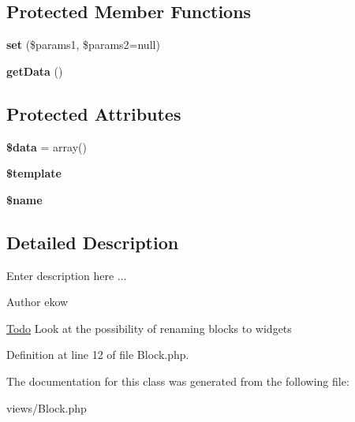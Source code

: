 \subsection*{Protected Member Functions}
\begin{DoxyCompactItemize}
\item 
\hypertarget{class_block_ae61665b42623aa60b64269393930163b}{
{\bfseries set} (\$params1, \$params2=null)}
\label{class_block_ae61665b42623aa60b64269393930163b}

\item 
\hypertarget{class_block_a6d15a2c34abf0344b58a46f60d5dee21}{
{\bfseries getData} ()}
\label{class_block_a6d15a2c34abf0344b58a46f60d5dee21}

\end{DoxyCompactItemize}
\subsection*{Protected Attributes}
\begin{DoxyCompactItemize}
\item 
\hypertarget{class_block_a27483b3f12a4d2af0ae285a332eca9e7}{
{\bfseries \$data} = array()}
\label{class_block_a27483b3f12a4d2af0ae285a332eca9e7}

\item 
\hypertarget{class_block_a95534afae96e07c0c2a478aad1acfd7b}{
{\bfseries \$template}}
\label{class_block_a95534afae96e07c0c2a478aad1acfd7b}

\item 
\hypertarget{class_block_a48798bb757fe3b037dc0bc8823a64c2c}{
{\bfseries \$name}}
\label{class_block_a48798bb757fe3b037dc0bc8823a64c2c}

\end{DoxyCompactItemize}


\subsection{Detailed Description}
Enter description here ... \begin{DoxyAuthor}{Author}
ekow 
\end{DoxyAuthor}
\begin{Desc}
\item[\hyperlink{todo__todo000384}{Todo}]Look at the possibility of renaming blocks to widgets \end{Desc}


Definition at line 12 of file Block.php.



The documentation for this class was generated from the following file:\begin{DoxyCompactItemize}
\item 
views/Block.php\end{DoxyCompactItemize}
